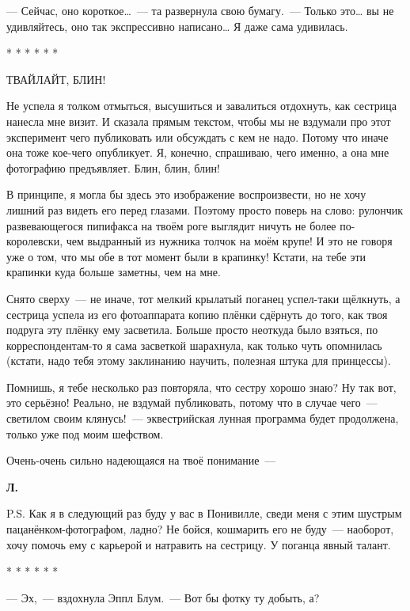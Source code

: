 \documentclass[fontsize=11pt,a5paper,titlepage=firstcover]{scrbook}
\begin{document}
--- Сейчас, оно короткое{\ldots}~--- та развернула свою бумагу.~--- Только это{\ldots} вы не удивляйтесь, оно так экспрессивно написано{\ldots} Я даже сама удивилась.
\begin{center}
	* * * * * *
\end{center}

ТВАЙЛАЙТ, БЛИН!

Не успела я толком отмыться, высушиться и завалиться отдохнуть, как сестрица нанесла мне визит. И сказала прямым текстом, чтобы мы не вздумали про этот эксперимент чего публиковать или обсуждать с кем не надо. Потому что иначе она тоже кое-чего опубликует. Я, конечно, спрашиваю, чего именно, а она мне фотографию предъявляет. Блин, блин, блин!

В принципе, я могла бы здесь это изображение воспроизвести, но не хочу лишний раз видеть его перед глазами. Поэтому просто поверь на слово: рулончик развевающегося пипифакса на твоём роге выглядит ничуть не более по-королевски, чем выдранный из нужника толчок на моём крупе! И это не говоря уже о том, что мы обе в тот момент были в крапинку! Кстати, на тебе эти крапинки куда больше заметны, чем на мне.

Снято сверху~--- не иначе, тот мелкий крылатый поганец успел-таки щёлкнуть, а сестрица успела из его фотоаппарата копию плёнки сдёрнуть до того, как твоя подруга эту плёнку ему засветила. Больше просто неоткуда было взяться, по корреспондентам-то я сама засветкой шарахнула, как только чуть опомнилась (кстати, надо тебя этому заклинанию научить, полезная штука для принцессы).

Помнишь, я тебе несколько раз повторяла, что сестру хорошо знаю? Ну так вот, это серьёзно! Реально, не вздумай публиковать, потому что в случае чего~--- светилом своим клянусь!~--- эквестрийская лунная программа будет продолжена, только уже под моим шефством.

Очень-очень сильно надеющаяся на твоё понимание~---
\begin{flushright}\textbf{Л.}\end{flushright}
P.S. Как я в следующий раз буду у вас в Понивилле, сведи меня с этим шустрым пацанёнком-фотографом, ладно? Не бойся, кошмарить его не буду~--- наоборот, хочу помочь ему с карьерой и натравить на сестрицу. У поганца явный талант.
\begin{center}
	* * * * * *
\end{center}

--- Эх,~--- вздохнула Эппл Блум.~--- Вот бы фотку ту добыть, а?
\end{document}
